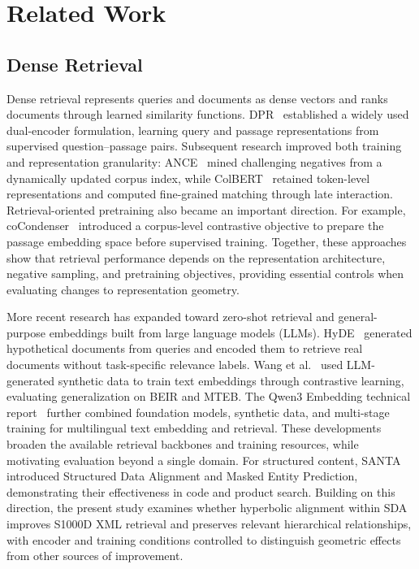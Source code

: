 \newpage

\section{Related Work}
\label{sec:02_related_work}

\subsection{Dense Retrieval}
Dense retrieval represents queries and documents as dense vectors and ranks documents through learned similarity functions. DPR~\cite{karpukhin2020dense} established a widely used dual-encoder formulation, learning query and passage representations from supervised question--passage pairs. Subsequent research improved both training and representation granularity: ANCE~\cite{xiong2021approximate} mined challenging negatives from a dynamically updated corpus index, while ColBERT~\cite{khattab2020colbert} retained token-level representations and computed fine-grained matching through late interaction. Retrieval-oriented pretraining also became an important direction. For example, coCondenser~\cite{gao2022unsupervised} introduced a corpus-level contrastive objective to prepare the passage embedding space before supervised training. Together, these approaches show that retrieval performance depends on the representation architecture, negative sampling, and pretraining objectives, providing essential controls when evaluating changes to representation geometry.

More recent research has expanded toward zero-shot retrieval and general-purpose embeddings built from large language models (LLMs). HyDE~\cite{gao2023precise} generated hypothetical documents from queries and encoded them to retrieve real documents without task-specific relevance labels. Wang et al.~\cite{wang2024improving} used LLM-generated synthetic data to train text embeddings through contrastive learning, evaluating generalization on BEIR and MTEB. The Qwen3 Embedding technical report~\cite{zhang2025qwen3} further combined foundation models, synthetic data, and multi-stage training for multilingual text embedding and retrieval. These developments broaden the available retrieval backbones and training resources, while motivating evaluation beyond a single domain. For structured content, SANTA~\cite{li2023structure} introduced Structured Data Alignment and Masked Entity Prediction, demonstrating their effectiveness in code and product search. Building on this direction, the present study examines whether hyperbolic alignment within SDA improves S1000D XML retrieval and preserves relevant hierarchical relationships, with encoder and training conditions controlled to distinguish geometric effects from other sources of improvement.

